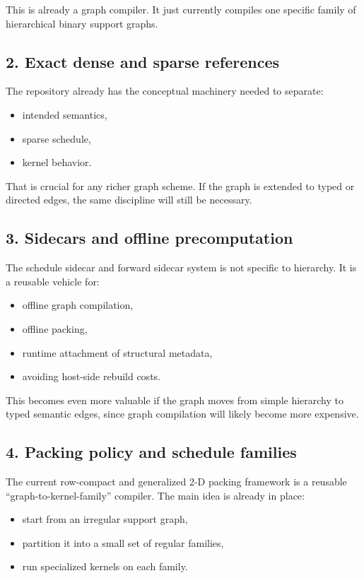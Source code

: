 \documentclass[11pt]{article}
\begin{document}
This is already a graph compiler. It just currently compiles one specific
family of hierarchical binary support graphs.

\subsection{2. Exact dense and sparse references}

The repository already has the conceptual machinery needed to separate:
\begin{itemize}[leftmargin=1.5em]
    \item intended semantics,
    \item sparse schedule,
    \item kernel behavior.
\end{itemize}

That is crucial for any richer graph scheme. If the graph is extended to typed
or directed edges, the same discipline will still be necessary.

\subsection{3. Sidecars and offline precomputation}

The schedule sidecar and forward sidecar system is not specific to hierarchy.
It is a reusable vehicle for:
\begin{itemize}[leftmargin=1.5em]
    \item offline graph compilation,
    \item offline packing,
    \item runtime attachment of structural metadata,
    \item avoiding host-side rebuild costs.
\end{itemize}

This becomes even more valuable if the graph moves from simple hierarchy to
typed semantic edges, since graph compilation will likely become more expensive.

\subsection{4. Packing policy and schedule families}

The current row-compact and generalized 2-D packing framework is a reusable
``graph-to-kernel-family'' compiler. The main idea is already in place:
\begin{itemize}[leftmargin=1.5em]
    \item start from an irregular support graph,
    \item partition it into a small set of regular families,
    \item run specialized kernels on each family.
\end{itemize}
\end{document}
